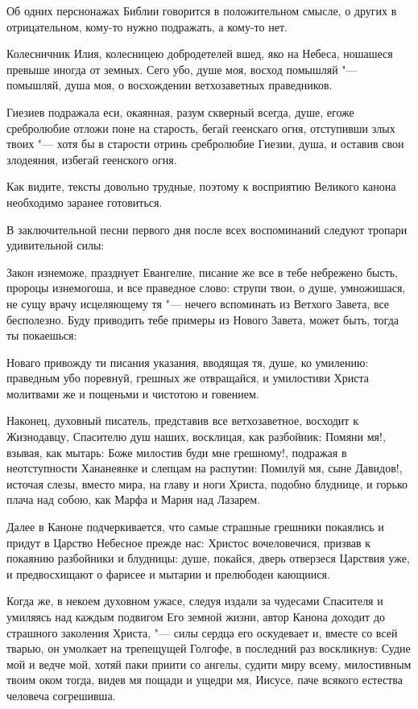 Об одних перснонажах Библии говорится в положительном смысле, о других в отрицательном, кому-то нужно подражать, а кому-то нет.


Колесничник Илия, колесницею добродетелей вшед, яко на Небеса, ношашеся превыше иногда от земных. Сего убо, душе моя, восход помышляй "--- помышляй, душа моя, о восхождении ветхозаветных праведников.


Гиезиев подражала еси, окаянная, разум скверный всегда, душе, егоже сребролюбие отложи поне на старость, бегай геенскаго огня, отступивши злых твоих "--- хотя бы в старости отринь сребролюбие Гиезии, душа, и оставив свои злодеяния, избегай геенского огня.


Как видите, тексты довольно трудные, поэтому к восприятию Великого канона необходимо заранее готовиться.


В заключительной песни первого дня после всех воспоминаний следуют тропари удивительной силы:


Закон изнеможе, празднует Евангелие, писание же все в тебе небрежено бысть, пророцы изнемогоша, и все праведное слово: струпи твои, о душе, умножишася, не сущу врачу исцеляющему тя "--- нечего вспоминать из Ветхого Завета, все бесполезно. Буду приводить тебе примеры из Нового Завета, может быть, тогда ты покаешься:


Новаго привожду ти писания указания, вводящая тя, душе, ко умилению: праведным убо поревнуй, грешных же отвращайся, и умилостиви Христа молитвами же и пощеньми и чистотою и говением.


Наконец, духовный писатель, представив все ветхозаветное, восходит к Жизнодавцу, Спасителю душ наших, восклицая, как разбойник: Помяни мя!, взывая, как мытарь: Боже милостив буди мне грешному!, подражая в неотступности Хананеянке и слепцам на распутии: Помилуй мя, сыне Давидов!, источая слезы, вместо мира, на главу и ноги Христа, подобно блуднице, и горько плача над собою, как Марфа и Мария над Лазарем.


Далее в Каноне подчеркивается, что самые страшные грешники покаялись и придут в Царство Небесное прежде нас: Христос вочеловечися, призвав к покаянию разбойники и блудницы: душе, покайся, дверь отверзеся Царствия уже, и предвосхищают о фарисее и мытарии и прелюбодеи кающиися.


Когда же, в некоем духовном ужасе, следуя издали за чудесами Спасителя и умиляясь над каждым подвигом Его земной жизни, автор Канона доходит до страшного заколения Христа, "--- силы сердца его оскудевает и, вместе со всей тварью, он умолкает на трепещущей Голгофе, в последний раз воскликнув: Судие мой и ведче мой, хотяй паки приити со ангелы, судити миру всему, милостивным твоим оком тогда, видев мя пощади и ущедри мя, Иисусе, паче всякого естества человеча согрешивша.


